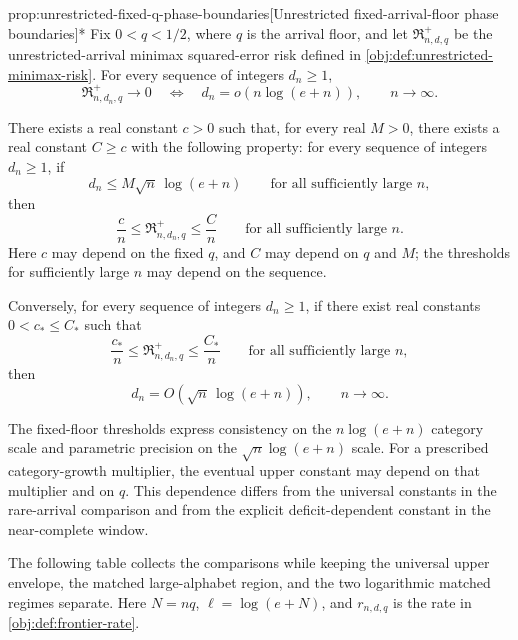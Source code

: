 \begin{propositionv}{prop:unrestricted-fixed-q-phase-boundaries}[Unrestricted fixed-arrival-floor phase boundaries]*
Fix \(0<q<1/2\), where \(q\) is the arrival floor, and let \(\mathfrak R^{+}_{n,d,q}\) be the unrestricted-arrival minimax squared-error risk defined in \cref{obj:def:unrestricted-minimax-risk}. For every sequence of integers \(d_n\ge1\),
\[
\mathfrak R^{+}_{n,d_n,q}\longrightarrow0
\quad\Longleftrightarrow\quad
d_n=o\!\left(n\log(e+n)\right),
\qquad n\to\infty.
\]

There exists a real constant \(c>0\) such that, for every real \(M>0\), there exists a real constant \(C\ge c\) with the following property: for every sequence of integers \(d_n\ge1\), if
\[
d_n\le M\sqrt n\,\log(e+n)
\qquad\text{for all sufficiently large }n,
\]
then
\[
\frac{c}{n}\le\mathfrak R^{+}_{n,d_n,q}\le\frac{C}{n}
\qquad\text{for all sufficiently large }n.
\]
Here \(c\) may depend on the fixed \(q\), and \(C\) may depend on \(q\) and \(M\); the thresholds for sufficiently large \(n\) may depend on the sequence.

Conversely, for every sequence of integers \(d_n\ge1\), if there exist real constants \(0<c_*\le C_*\) such that
\[
\frac{c_*}{n}\le\mathfrak R^{+}_{n,d_n,q}\le\frac{C_*}{n}
\qquad\text{for all sufficiently large }n,
\]
then
\[
d_n=O\!\left(\sqrt n\,\log(e+n)\right),
\qquad n\to\infty.
\]
\end{propositionv}

The fixed-floor thresholds express consistency on the \(n\log(e+n)\) category scale and parametric precision on the \(\sqrt n\log(e+n)\) scale. For a prescribed category-growth multiplier, the eventual upper constant may depend on that multiplier and on \(q\). This dependence differs from the universal constants in the rare-arrival comparison and from the explicit deficit-dependent constant in the near-complete window.

The following table collects the comparisons while keeping the universal upper envelope, the matched large-alphabet region, and the two logarithmic matched regimes separate. Here \(N=nq\), \(\ell=\log(e+N)\), and \(r_{n,d,q}\) is the rate in \cref{obj:def:frontier-rate}.

